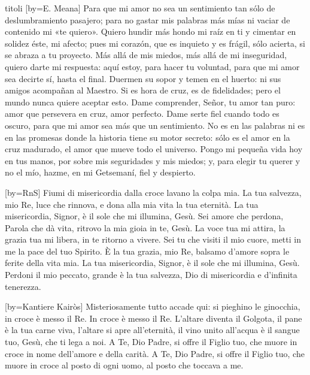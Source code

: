 \begin{songs}{titoli}
[by={E. Meana}]
\beginverse
Para que mi amor no sea un sentimiento
tan sólo de deslumbramiento pasajero;
para no gastar mis palabras más mías
ni vaciar de contenido mi «te quiero».
Quiero hundir más hondo mi raíz en ti
y cimentar en solidez éste, mi afecto;
pues mi corazón, que es inquieto y es frágil,
sólo acierta, si se abraza a tu proyecto.
\endverse
\beginchorus
Más allá de mis miedos,
más allá de mi inseguridad,
quiero darte mi respuesta:
aquí estoy, para hacer tu voluntad,
para que mi amor sea decirte sí,
hasta el final.
\endchorus
\beginverse
Duermen su sopor y temen en el huerto:
ni sus amigos acompañan al Maestro.
Si es hora de cruz, es de fidelidades;
pero el mundo nunca quiere aceptar esto.
Dame comprender, Señor, tu amor tan puro:
amor que persevera en cruz, amor perfecto.
Dame serte fiel cuando todo es oscuro,
para que mi amor sea más que un sentimiento.
\endverse
\beginverse
No es en las palabras ni es en las promesas
donde la historia tiene su motor secreto:
sólo es el amor en la cruz madurado,
el amor que mueve todo el universo.
\endverse
\beginverse
Pongo mi pequeña vida hoy en tus manos,
por sobre mis seguridades y mis miedos;
y, para elegir tu querer y no el mío,
hazme, en mi Getsemaní, fiel y despierto.
\endverse
\endsong

[by={RnS}]
\beginverse
Fiumi di misericordia dalla croce lavano la colpa mia.
La tua salvezza, mio Re, luce che rinnova,
e dona alla mia vita la tua eternità.
La tua misericordia, Signor, è il sole che mi illumina, Gesù.
\endverse
\beginchorus
Sei amore che perdona, Parola che dà vita,
ritrovo la mia gioia in te, Gesù.
La voce tua mi attira, la grazia tua mi libera,
in te ritorno a vivere.
\endchorus
\beginverse
Sei tu che visiti il mio cuore, metti in me la pace del tuo Spirito.
È la tua grazia, mio Re, balsamo d'amore
sopra le ferite della vita mia.
La tua misericordia, Signor, è il sole che mi illumina, Gesù.
\endverse
\beginverse
Perdoni il mio peccato, grande è la tua salvezza,
Dio di misericordia e d'infinita tenerezza. 
\endverse
\endsong

[by={Kantiere Kairòs}]
\beginverse
Misteriosamente tutto accade qui:
si pieghino le ginocchia, in croce è messo il Re. In croce è messo il Re.
\endverse
\beginverse
L'altare diventa il Golgota, il pane è la tua carne viva,
l'altare si apre all'eternità,
il vino unito all'acqua è il sangue tuo, Gesù, che ti lega a noi.
\endverse
\beginverse
A Te, Dio Padre, si offre il Figlio tuo,
che muore in croce in nome dell'amore e della carità.
A Te, Dio Padre, si offre il Figlio tuo,
che muore in croce al posto di ogni uomo,
al posto che toccava a me.
\endverse
\endsong


\end{songs}
